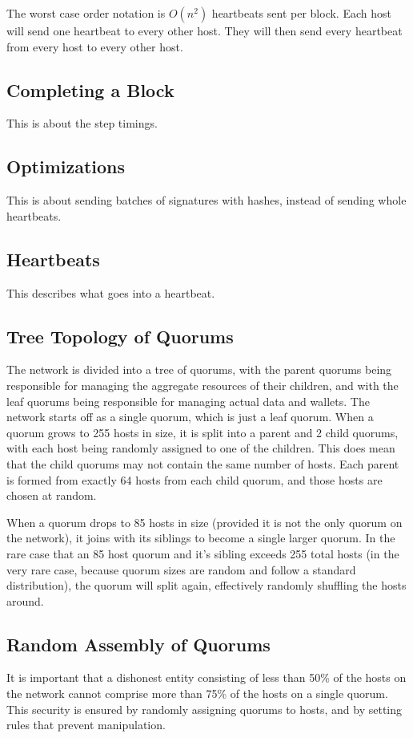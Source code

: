 \documentclass[twocolumn]{article}
\begin{document}
The worst case order notation is $O(n^2)$ heartbeats sent per block.
Each host will send one heartbeat to every other host.
They will then send every heartbeat from every host to every other host.

\subsection{Completing a Block}
This is about the step timings.

\subsection{Optimizations}
This is about sending batches of signatures with hashes, instead of sending whole heartbeats.

\subsection{Heartbeats}
This describes what goes into a heartbeat.

\subsection{Tree Topology of Quorums}
The network is divided into a tree of quorums, with the parent quorums being responsible for managing the aggregate resources of their children, and with the leaf quorums being responsible for managing actual data and wallets.
The network starts off as a single quorum, which is just a leaf quorum.
When a quorum grows to 255 hosts in size, it is split into a parent and 2 child quorums, with each host being randomly assigned to one of the children.
This does mean that the child quorums may not contain the same number of hosts.
Each parent is formed from exactly 64 hosts from each child quorum, and those hosts are chosen at random.

When a quorum drops to 85 hosts in size (provided it is not the only quorum on the network), it joins with its siblings to become a single larger quorum.
In the rare case that an 85 host quorum and it's sibling exceeds 255 total hosts (in the very rare case, because quorum sizes are random and follow a standard distribution), the quorum will split again, effectively randomly shuffling the hosts around.


\subsection{Random Assembly of Quorums}
It is important that a dishonest entity consisting of less than 50\% of the hosts on the network cannot comprise more than 75\% of the hosts on a single quorum.
This security is ensured by randomly assigning quorums to hosts, and by setting rules that prevent manipulation.
\end{document}
